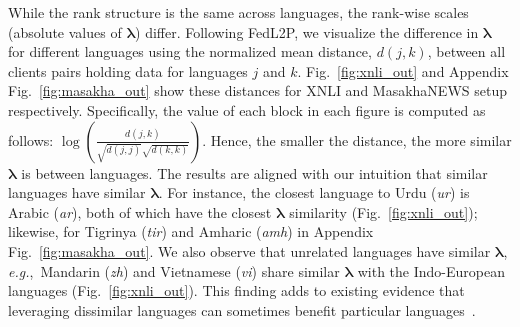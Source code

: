 While the rank structure is the same across languages, the rank-wise scales (absolute values of $\bm{\lambda}$) differ. Following FedL2P, we visualize the difference in $\bm{\lambda}$ for different languages using the normalized mean distance, $d(j,k)$, between all clients pairs holding data for languages $j$ and $k$. Fig.~\ref{fig:xnli_out} and Appendix Fig.~\ref{fig:masakha_out} show these distances for XNLI and MasakhaNEWS setup respectively. Specifically, the value of each block in each figure is computed as follows: $\log(\frac{d(j,k)}{\sqrt{d(j,j)}\sqrt{d(k,k)}})$. Hence, the smaller the distance, the more similar $\bm{\lambda}$ is between languages. The results are aligned with our intuition that similar languages have similar $\bm{\lambda}$. For instance, the closest language to Urdu (\textit{ur}) is Arabic (\textit{ar}), both of which have the closest $\bm{\lambda}$ similarity (Fig.~\ref{fig:xnli_out}); likewise, for Tigrinya (\textit{tir}) and Amharic (\textit{amh}) in Appendix Fig.~\ref{fig:masakha_out}. We also observe that unrelated languages have similar $\bm{\lambda}$, \textit{e.g.},~Mandarin (\textit{zh}) and Vietnamese (\textit{vi}) share similar $\bm{\lambda}$ with the Indo-European languages (Fig.~\ref{fig:xnli_out}). This finding adds to existing evidence that leveraging dissimilar languages can sometimes benefit particular languages~\cite{fedllm-bench}.

